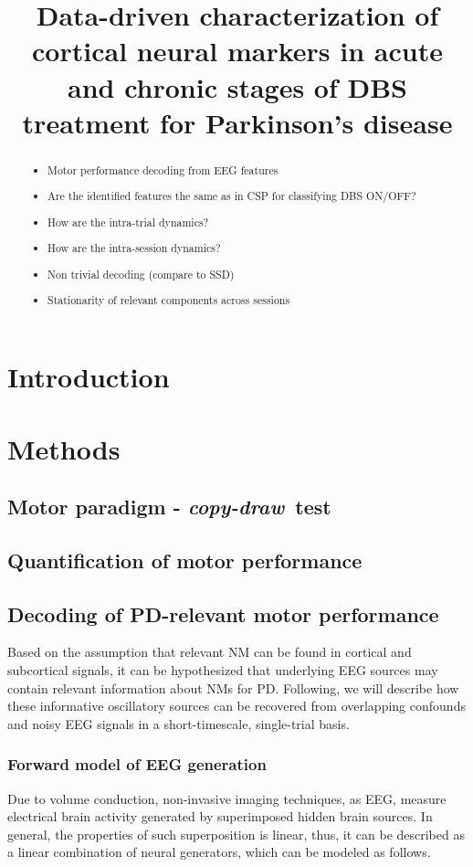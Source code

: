 \documentclass[10pt,a4paper]{article}
\title{Data-driven characterization of cortical neural markers in acute and chronic stages of DBS treatment for Parkinson's disease}
\newcommand{\cpdt}[0]{\textit{copy-draw}~test}
\begin{document}
\maketitle
\listoftodos

\begin{abstract}

\begin{itemize}
\item Motor performance decoding from EEG features
\item Are the identified features the same as in CSP for classifying DBS ON/OFF?
\item How are the intra-trial dynamics?
\item How are the intra-session dynamics?
\item Non trivial decoding (compare to SSD)
\item Stationarity of relevant components across sessions
\end{itemize}
\end{abstract}

\section{Introduction}

\section{Methods}
\subsection{Motor paradigm - \cpdt}
\subsection{Quantification of motor performance}
\subsection{Decoding of PD-relevant motor performance}

Based on the assumption that relevant NM can be found in cortical and subcortical signals, it can be hypothesized that underlying EEG sources may contain relevant information about NMs for PD.  Following, we will describe how these informative oscillatory sources can be recovered from overlapping confounds and noisy EEG signals in a short-timescale, single-trial basis. 

\subsubsection{Forward model of EEG generation}
\label{par:modeling}
Due to volume conduction, non-invasive imaging techniques, as EEG, measure electrical brain activity generated by superimposed hidden brain sources. In general, the properties of such superposition is linear, thus, it can be described as a linear combination of neural generators, which can be modeled as follows.
\end{document}
